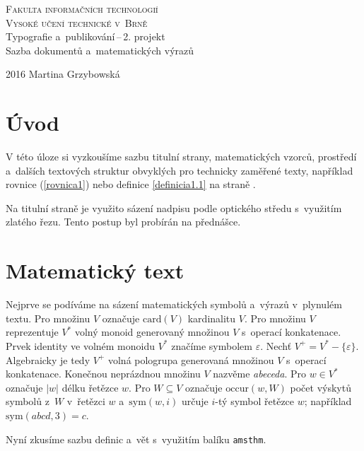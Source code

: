 \documentclass[a4paper,11pt,twocolumn,titlepage]{article}
\theoremstyle{definition}
\theoremstyle{plain}
\begin{document}
	\begin{titlepage}
		\begin{center}
			{\Huge \textsc {Fakulta informačních technologií \\
							Vysoké učení technické v~Brně}}\\
			{\LARGE{Typografie a~publikování\,--\,2. projekt\\
					Sazba dokumentů a~matematických výrazů}}
		\end{center}
		{\Large 2016 \hfill Martina Grzybowská}
	\end{titlepage}

	\section*{Úvod}
V této úloze si vyzkoušíme sazbu titulní strany, matematických vzorců, prostředí a~dalších textových struktur obvyklých pro technicky zaměřené texty, například rovnice (\ref{rovnica1}) nebo definice \ref{definicia1.1} na straně \pageref{definicia1.1}.

Na titulní straně je využito sázení nadpisu podle optického středu s~využitím zlatého řezu. Tento postup byl probírán na přednášce.

\section{Matematický text}
Nejprve se podíváme na sázení matematických symbolů a~výrazů v~plynulém textu. Pro množinu $V$ označuje $\mbox{card}(V)$ kardinalitu $V$.
Pro množinu $V$ reprezentuje $V^*$ volný monoid generovaný množinou $V$ s~operací konkatenace.
Prvek identity ve volném monoidu $V^*$ značíme symbolem $\varepsilon$.
Nechť $V^+=V^*-\{\varepsilon\}$. Algebraicky je tedy $V^+$ volná pologrupa generovaná množinou $V$ s~operací konkatenace.
Konečnou neprázdnou množinu $V$ nazvěme \emph{abeceda}.
Pro $w \in V^*$  označuje $|w|$ délku řetězce $w$. Pro $W\subseteq V$ označuje $\mbox{occur}(w,W)$ počet výskytů symbolů z~$W$ v~řetězci $w$ a~$\mbox{sym}(w,i)$ určuje $i$-tý symbol řetězce $w$; například $\mbox{sym}(abcd,3)=c$.

Nyní zkusíme sazbu definic a~vět s~využitím balíku \texttt{amsthm}.
\end{document}
